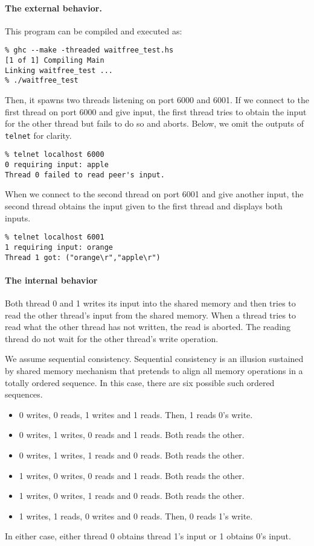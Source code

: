 \paragraph{The external behavior.}
  This program can be compiled and executed as:
\begin{verbatim}
% ghc --make -threaded waitfree_test.hs
[1 of 1] Compiling Main
Linking waitfree_test ...
% ./waitfree_test
\end{verbatim}
Then, it spawns two threads listening on port 6000 and 6001.  If we
connect to the first thread on port 6000 and
give input, the first thread tries to obtain the input for the other
thread but fails to do so and aborts.  Below, we omit the outputs of
\texttt{telnet} for clarity.
\begin{verbatim}
% telnet localhost 6000
0 requiring input: apple
Thread 0 failed to read peer's input.
\end{verbatim}
When we connect to the second thread on port 6001 and give another
input,
the second thread obtains the input given to the first thread and displays
both inputs.
\begin{verbatim}
% telnet localhost 6001
1 requiring input: orange
Thread 1 got: ("orange\r","apple\r")
\end{verbatim}

\paragraph{The internal behavior}

Both thread 0 and 1 writes its input into the shared memory and then
tries to read the other thread's input from the shared memory.  When
a thread tries to read what the other thread has not written, the read
is aborted.  The reading thread do not wait for the other thread's write
operation.

We assume sequential consistency.  Sequential consistency is an illusion
sustained by shared memory mechanism that pretends to align all memory
operations in a totally ordered sequence.  In this case, there are
six possible such ordered sequences.
\begin{itemize}
 \item 0 writes, 0 reads, 1 writes and 1 reads.  Then, 1 reads 0's write.
 \item 0 writes, 1 writes, 0 reads and 1 reads.  Both reads the other.
 \item 0 writes, 1 writes, 1 reads and 0 reads.  Both reads the other.
 \item 1 writes, 0 writes, 0 reads and 1 reads.  Both reads the other.
 \item 1 writes, 0 writes, 1 reads and 0 reads.  Both reads the other.
 \item 1 writes, 1 reads, 0 writes and 0 reads.  Then, 0 reads 1's write.
\end{itemize}
In either case, either thread 0 obtains thread 1's input or 1 obtains
0's input.

